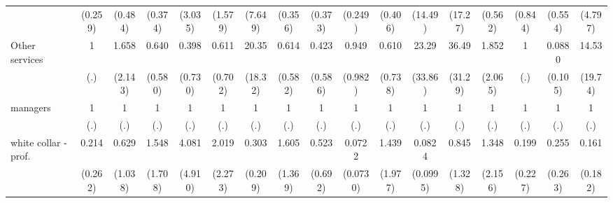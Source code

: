 {\begin{tabular}{l*{16}{c}}
                    &     (0.259)         &     (0.484)         &     (0.374)         &     (3.035)         &     (1.579)         &     (7.649)         &     (0.356)         &     (0.373)         &     (0.249)         &     (0.406)         &     (14.49)         &     (17.27)         &     (0.562)         &     (0.844)         &     (0.554)         &     (4.797)         \\
[1em]
Other services      &           1         &       1.658         &       0.640         &       0.398         &       0.611         &       20.35\sym{***}&       0.614         &       0.423         &       0.949         &       0.610         &       23.29\sym{*}  &       36.49\sym{***}&       1.852         &           1         &      0.0880\sym{*}  &       14.53\sym{*}  \\
                    &         (.)         &     (2.143)         &     (0.580)         &     (0.730)         &     (0.702)         &     (18.32)         &     (0.582)         &     (0.586)         &     (0.982)         &     (0.738)         &     (33.86)         &     (31.29)         &     (2.065)         &         (.)         &     (0.105)         &     (19.74)         \\
[1em]
managers            &           1         &           1         &           1         &           1         &           1         &           1         &           1         &           1         &           1         &           1         &           1         &           1         &           1         &           1         &           1         &           1         \\
                    &         (.)         &         (.)         &         (.)         &         (.)         &         (.)         &         (.)         &         (.)         &         (.)         &         (.)         &         (.)         &         (.)         &         (.)         &         (.)         &         (.)         &         (.)         &         (.)         \\
[1em]
white collar - prof.&       0.214         &       0.629         &       1.548         &       4.081         &       2.019         &       0.303         &       1.605         &       0.523         &      0.0722\sym{**} &       1.439         &      0.0824\sym{*}  &       0.845         &       1.348         &       0.199         &       0.255         &       0.161         \\
                    &     (0.262)         &     (1.038)         &     (1.708)         &     (4.910)         &     (2.273)         &     (0.209)         &     (1.369)         &     (0.692)         &    (0.0730)         &     (1.977)         &    (0.0995)         &     (1.328)         &     (2.156)         &     (0.227)         &     (0.263)         &     (0.182)         \\

\end{tabular}}
